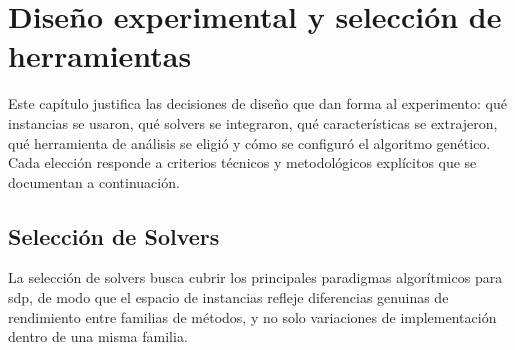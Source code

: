 ﻿\chapter{Diseño experimental y selección de herramientas}
\label{ch:disenio}

Este capítulo justifica las decisiones de diseño que dan forma al experimento: qué instancias se usaron,
qué solvers se integraron, qué características se extrajeron, qué herramienta de análisis se eligió y
cómo se configuró el algoritmo genético. Cada elección responde a criterios técnicos y metodológicos explícitos
que se documentan a continuación.

\section{Selección de Solvers}
\label{sec:seleccion_solvers}

La selección de solvers busca cubrir los principales paradigmas algorítmicos para \acrshort{sdp}, de modo que el espacio de
instancias refleje diferencias genuinas de rendimiento entre familias de métodos, y no solo variaciones de implementación dentro
de una misma familia.

